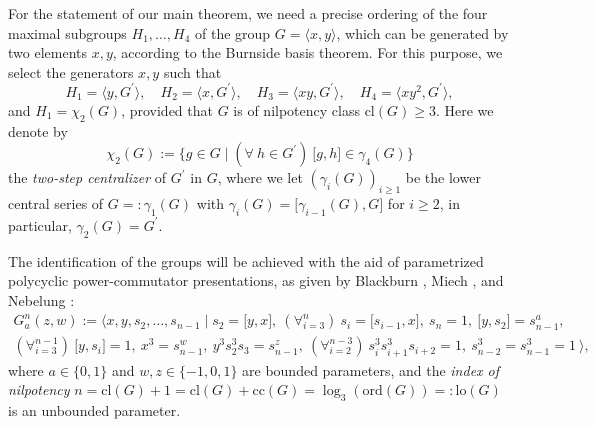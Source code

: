 \documentclass{amsart}
\theoremstyle{definition}
\numberwithin{equation}{section}
\begin{document}
For the statement of our main theorem,
we need a precise ordering of the four maximal subgroups \(H_1,\ldots,H_4\) of the group \(G=\langle x,y\rangle\),
which can be generated by two elements \(x,y\),
according to the Burnside basis theorem.
For this purpose, we select the generators \(x,y\) such that
\begin{equation}
\label{eqn:MaximalSubgroups}
H_1=\langle y,G^\prime\rangle,\quad
H_2=\langle x,G^\prime\rangle,\quad
H_3=\langle xy,G^\prime\rangle,\quad
H_4=\langle xy^2,G^\prime\rangle,
\end{equation}
and \(H_1=\chi_2(G)\),
provided that \(G\) is of nilpotency class \(\mathrm{cl}(G)\ge 3\).
Here we denote by
\begin{equation}
\label{eqn:TwoStepCentralizer}
\chi_2(G):=\lbrace g\in G\mid (\forall\ h\in G^\prime)\ \lbrack g,h\rbrack\in\gamma_4(G)\rbrace
\end{equation}
the \textit{two-step centralizer} of \(G^\prime\) in \(G\),
where we let \((\gamma_i(G))_{i\ge 1}\) be the lower central series of \(G=:\gamma_1(G)\)
with \(\gamma_i(G)=\lbrack\gamma_{i-1}(G),G\rbrack\) for \(i\ge 2\), in particular, \(\gamma_2(G)=G^\prime\).

The identification of the groups will be achieved with the aid of
parametrized polycyclic power-commutator presentations, as given by
Blackburn
\cite{Bl2},
Miech
\cite{Mi},
and Nebelung
\cite{Ne}:
\begin{equation}
\label{eqn:Presentation}
\begin{aligned}
G_a^n(z,w) := \langle x,y,s_2,\ldots,s_{n-1}\mid s_2=\lbrack y,x\rbrack,\ (\forall_{i=3}^n)\ s_i=\lbrack s_{i-1},x\rbrack,\ s_n=1,\ \lbrack y,s_2\rbrack=s_{n-1}^a, \\
(\forall_{i=3}^{n-1})\ \lbrack y,s_i\rbrack=1,\ x^3=s_{n-1}^w,\ y^3s_2^3s_3=s_{n-1}^z,\ (\forall_{i=2}^{n-3})\ s_i^3s_{i+1}^3s_{i+2}=1,\ s_{n-2}^3=s_{n-1}^3=1\ \rangle,
\end{aligned}
\end{equation}
where \(a\in\lbrace 0,1\rbrace\) and \(w,z\in\lbrace -1,0,1\rbrace\) are bounded parameters,
and the \textit{index of nilpotency} \(n=\mathrm{cl}(G)+1=\mathrm{cl}(G)+\mathrm{cc}(G)=\log_3(\mathrm{ord}(G))=:\mathrm{lo}(G)\) is an unbounded parameter.

\end{document}
